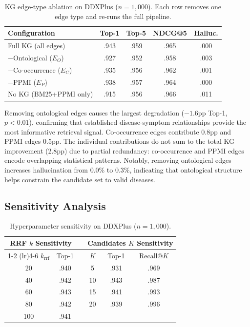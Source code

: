 \documentclass[runningheads]{llncs}
\begin{document}
\begin{table}[t]
\centering
\caption{KG edge-type ablation on DDXPlus ($n{=}1{,}000$). Each row removes one edge type and re-runs the full pipeline.}
\label{tab:edge_ablation}
\begin{tabular}{lcccc}
\toprule
\textbf{Configuration} & \textbf{Top-1} & \textbf{Top-5} & \textbf{NDCG@5} & \textbf{Halluc.} \\
\midrule
Full KG (all edges)      & .943 & .959 & .965 & .000 \\
$-$Ontological ($E_O$)   & .927 & .952 & .958 & .003 \\
$-$Co-occurrence ($E_C$) & .935 & .956 & .962 & .001 \\
$-$PPMI ($E_P$)          & .938 & .957 & .964 & .000 \\
No KG (BM25+PPMI only)   & .915 & .956 & .966 & .011 \\
\bottomrule
\end{tabular}
\end{table}

Removing ontological edges causes the largest degradation ($-1.6$pp Top-1, $p < 0.01$), confirming that established disease-symptom relationships provide the most informative retrieval signal. Co-occurrence edges contribute $0.8$pp and PPMI edges $0.5$pp. The individual contributions do not sum to the total KG improvement (2.8pp) due to partial redundancy: co-occurrence and PPMI edges encode overlapping statistical patterns. Notably, removing ontological edges increases hallucination from 0.0\% to 0.3\%, indicating that ontological structure helps constrain the candidate set to valid diseases.

\subsection{Sensitivity Analysis}
\label{sec:sensitivity}

\begin{table}[t]
\centering
\caption{Hyperparameter sensitivity on DDXPlus ($n{=}1{,}000$).}
\label{tab:sensitivity}
\begin{tabular}{cccccc}
\toprule
\multicolumn{2}{c}{\textbf{RRF $k$ Sensitivity}} & & \multicolumn{3}{c}{\textbf{Candidates $K$ Sensitivity}} \\
\cmidrule(lr){1-2} \cmidrule(lr){4-6}
$k_{\text{rrf}}$ & Top-1 & & $K$ & Top-1 & Recall@$K$ \\
\midrule
20  & .940 & & 5  & .931 & .969 \\
40  & .942 & & 10 & .943 & .987 \\
60  & .943 & & 15 & .941 & .993 \\
80  & .942 & & 20 & .939 & .996 \\
100 & .941 & & & & \\
\bottomrule
\end{tabular}
\end{table}
\end{document}
